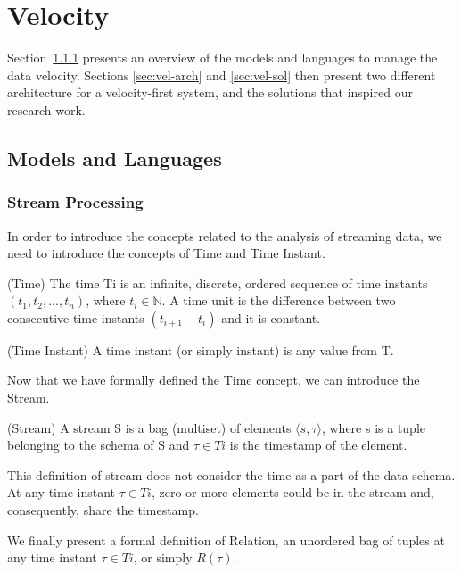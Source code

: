\section{Velocity}\label{sec:velocity}
Section~\ref{sec:stream-proc} presents an overview of the models and languages to manage the data velocity. Sections \ref{sec:vel-arch} and \ref{sec:vel-sol} then present two different architecture for a velocity-first system, and the solutions that inspired our research work.

\subsection{Models and Languages}

\subsubsection{Stream Processing} \label{sec:stream-proc}
In order to introduce the concepts related to the analysis of streaming data, we need to introduce the concepts of Time and Time Instant.

\begin{Definition}
(Time) The time Ti is an infinite, discrete, ordered sequence of time instants $(t_1,t_2,..., t_n)$, where $t_i \in \mathbb{N}$. A time unit is the difference between two consecutive time instants $(t_{i+1} - t_i)$ and it is constant.
\end{Definition}

\begin{Definition}
(Time Instant) A time instant (or simply instant) is any value from T.
\end{Definition}

Now that we have formally defined the Time concept, we can introduce the Stream.

\begin{Definition}
(Stream) A stream S is a bag (multiset) of elements $\langle s,\tau \rangle$, where s is a tuple belonging to the schema of S and $\tau \in Ti$ is the timestamp of the element.
\end{Definition}

This definition of stream does not consider the time as a part of the data schema. 
At any time instant $\tau \in Ti$, zero or more elements could be in the stream and, consequently, share the timestamp.

We finally present a formal definition of Relation, an unordered bag of tuples at any time instant $\tau \in Ti$, or simply $R(\tau)$.

